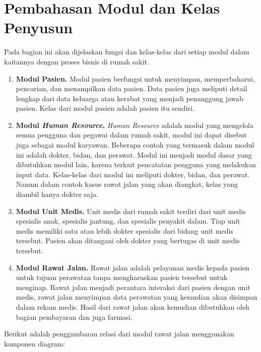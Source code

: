 \section{Pembahasan Modul dan Kelas Penyusun}
Pada bagian ini akan dijelaskan fungsi dan kelas-kelas dari setiap modul dalam kaitannya dengan proses bisnis di rumah sakit.

\begin{enumerate}[leftmargin=*]
	\item \textbf{Modul Pasien.} Modul pasien berfungsi untuk menyimpan, memperbaharui, pencarian, dan menampilkan data pasien. Data pasien juga meliputi detail lengkap dari data keluarga atau kerabat yang menjadi penanggung jawab pasien. Kelas dari modul pasien adalah pasien itu sendiri.
	\item \textbf{Modul \textit{Human Resource}.} \textit{Human Resource} adalah modul yang mengelola semua pengguna dan pegawai dalam rumah sakit, modul ini dapat disebut juga sebagai modul karyawan. Beberapa contoh yang termasuk dalam modul ini adalah dokter, bidan, dan perawat. Modul ini menjadi modul dasar yang dibutuhkan modul lain, karena terkait pencatatan pengguna yang melakukan input data. Kelas-kelas dari modul ini meliputi dokter, bidan, dan perawat. Namun dalam contoh kasus rawat jalan yang akan diangkat, kelas yang diambil hanya dokter saja.
	\item \textbf{Modul Unit Medis.} Unit medis dari rumah sakit terdiri dari unit medis spesialis anak, spesialis jantung, dan spesialis penyakit dalam. Tiap unit medis memiliki satu atau lebih dokter spesialis dari bidang unit medis tersebut. Pasien akan ditangani oleh dokter yang bertugas di unit medis tersebut.
	\item \textbf{Modul Rawat Jalan.} Rawat jalan adalah pelayanan medis kepada pasien untuk tujuan perawatan tanpa mengharuskan pasien tersebut untuk menginap. Rawat jalan menjadi perantara interaksi dari pasien dengan unit medis, rawat jalan menyimpan data perawatan yang kemudian akan disimpan dalam rekam medis. Hasil dari rawat jalan akan kemudian dibutuhkan oleh bagian pembayaran dan juga farmasi.
\end{enumerate}

Berikut adalah penggambaran relasi dari modul rawat jalan menggunakan komponen diagram:

\begin{adjustbox}{width=1\textwidth}
	\begin{minipage}{\linewidth}
	\end{minipage}
\end{adjustbox}

